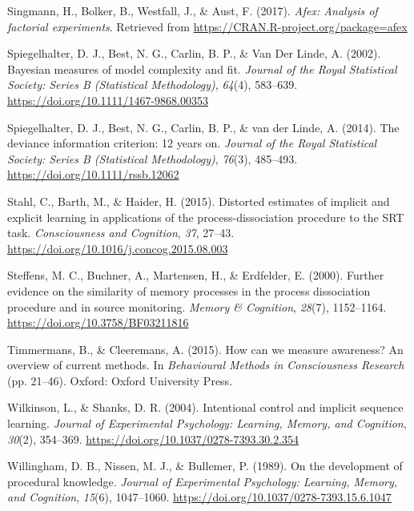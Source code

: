 \documentclass[english,,man]{apa6}
\begin{document}
\leavevmode\hypertarget{ref-R-afex}{}%
Singmann, H., Bolker, B., Westfall, J., \& Aust, F. (2017). \emph{Afex: Analysis of factorial experiments}. Retrieved from \url{https://CRAN.R-project.org/package=afex}

\leavevmode\hypertarget{ref-spiegelhalter_bayesian_2002}{}%
Spiegelhalter, D. J., Best, N. G., Carlin, B. P., \& Van Der Linde, A. (2002). Bayesian measures of model complexity and fit. \emph{Journal of the Royal Statistical Society: Series B (Statistical Methodology)}, \emph{64}(4), 583--639. \url{https://doi.org/10.1111/1467-9868.00353}

\leavevmode\hypertarget{ref-spiegelhalter_deviance_2014}{}%
Spiegelhalter, D. J., Best, N. G., Carlin, B. P., \& van der Linde, A. (2014). The deviance information criterion: 12 years on. \emph{Journal of the Royal Statistical Society: Series B (Statistical Methodology)}, \emph{76}(3), 485--493. \url{https://doi.org/10.1111/rssb.12062}

\leavevmode\hypertarget{ref-stahl_distorted_2015}{}%
Stahl, C., Barth, M., \& Haider, H. (2015). Distorted estimates of implicit and explicit learning in applications of the process-dissociation procedure to the SRT task. \emph{Consciousness and Cognition}, \emph{37}, 27--43. \url{https://doi.org/10.1016/j.concog.2015.08.003}

\leavevmode\hypertarget{ref-steffens_further_2000}{}%
Steffens, M. C., Buchner, A., Martensen, H., \& Erdfelder, E. (2000). Further evidence on the similarity of memory processes in the process dissociation procedure and in source monitoring. \emph{Memory \& Cognition}, \emph{28}(7), 1152--1164. \url{https://doi.org/10.3758/BF03211816}

\leavevmode\hypertarget{ref-timmermans_how_2015}{}%
Timmermans, B., \& Cleeremans, A. (2015). How can we measure awareness? An overview of current methods. In \emph{Behavioural Methods in Consciousness Research} (pp. 21--46). Oxford: Oxford University Press.

\leavevmode\hypertarget{ref-wilkinson_intentional_2004}{}%
Wilkinson, L., \& Shanks, D. R. (2004). Intentional control and implicit sequence learning. \emph{Journal of Experimental Psychology: Learning, Memory, and Cognition}, \emph{30}(2), 354--369. \url{https://doi.org/10.1037/0278-7393.30.2.354}

\leavevmode\hypertarget{ref-willingham_development_1989}{}%
Willingham, D. B., Nissen, M. J., \& Bullemer, P. (1989). On the development of procedural knowledge. \emph{Journal of Experimental Psychology: Learning, Memory, and Cognition}, \emph{15}(6), 1047--1060. \url{https://doi.org/10.1037/0278-7393.15.6.1047}
\end{document}
